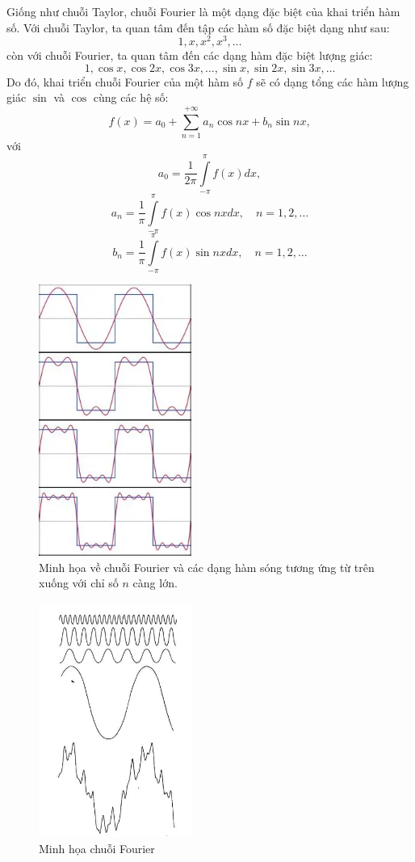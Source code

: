 \documentclass[12pt,a4paper]{report}
\numberwithin{equation}{section}
\theoremstyle{definition} %
\begin{document}
		 Giống như chuỗi Taylor, chuỗi Fourier là một dạng đặc biệt của khai triển hàm số. 
		 Với chuỗi Taylor, ta quan tâm đến tập các hàm số đặc biệt dạng như sau: 
		\begin{equation}
		\tag{a}
		1,x,x^2,x^3,\ldots
		\end{equation}
		 còn với chuỗi Fourier, ta quan tâm đến các dạng hàm đặc biệt lượng giác:
		\begin{equation}
		\tag{b}
		1,\cos x, \cos 2x, \cos 3x,\ldots,\sin x,\sin 2x,\sin 3x,\ldots
		\end{equation}
		Do đó, khai triển chuỗi Fourier của một hàm số $f$ sẽ có dạng tổng các hàm lượng giác $\sin$ và $\cos$ cùng các hệ số:
		\begin{equation}
			\tag{c}
			f(x) = a_0 + \sum_{n=1}^{+\infty}a_n\cos nx + b_n\sin nx,
		\end{equation}
với 
\[a_0 = \dfrac{1}{2\pi}\int\limits_{-\pi}^{\pi}f(x)dx,\]
\[a_n = \dfrac{1}{\pi}\int\limits_{-\pi}^{\pi}f(x)\cos nxdx,\quad n=1,2,\ldots\]
\[b_n = \dfrac{1}{\pi}\int\limits_{-\pi}^{\pi}f(x)\sin nxdx,\quad n=1,2,\ldots\]
     \begin{figure}[H]
		 \centering
		 \includegraphics[width=5cm]{img/fourier.png}
		 \caption{Minh họa về chuỗi Fourier và các dạng hàm sóng tương ứng từ trên xuống với chỉ số $n$ càng lớn.}
		 \label{fig12}
		 \end{figure}
		 \begin{figure}[H]
		 \centering
		 \includegraphics[width=5cm]{img/fourier1.png}
		 \caption{Minh họa chuỗi Fourier}
		 \label{fig13}
		 \end{figure}
\end{document}
